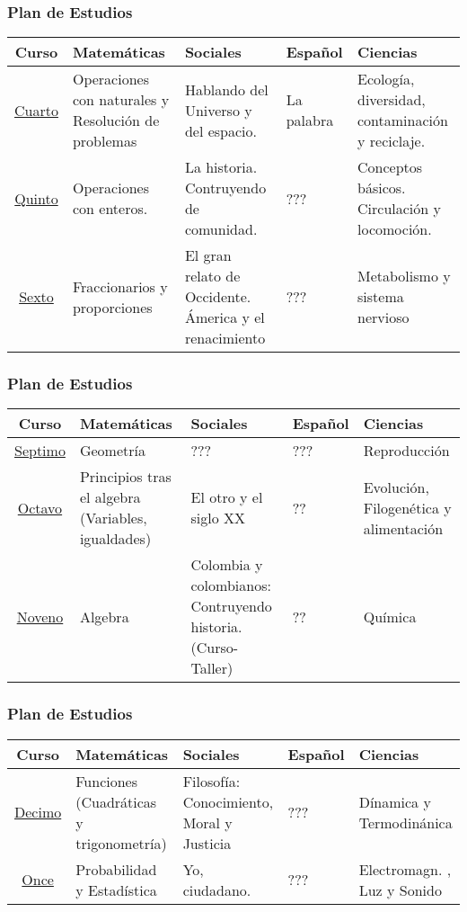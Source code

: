 \documentclass{beamer}
\begin{document}
\begin{frame}
\fontsize{9pt}{10}\selectfont
\frametitle{Plan de Estudios}
\begin{table}
\centering
\begin{tabular}{|c|p{2cm}|p{2cm}|p{2cm}|p{2cm}|}
\hline 
\textbf{Curso} & \textbf{Matem\'aticas} &\textbf{Sociales} &\textbf{Espa\~nol} & \textbf{Ciencias}\\
\hline
\underline{Cuarto} & Operaciones con naturales y Resoluci\'on de problemas   & Hablando del Universo y del espacio.  & La palabra & Ecolog\'ia, diversidad, contaminaci\'on y reciclaje.  \\
\underline{Quinto} & Operaciones con enteros.  & La historia. Contruyendo de comunidad. & ??? &Conceptos b\'asicos. Circulaci\'on y locomoci\'on.  \\
\underline{Sexto} & Fraccionarios y proporciones & El gran relato de Occidente. \'America y el renacimiento  & ??? & Metabolismo y sistema nervioso \\
\hline
\end{tabular}
\end{table}
\end{frame}


\begin{frame}
\fontsize{9pt}{10}\selectfont
\frametitle{Plan de Estudios}
\begin{table}
\centering
\begin{tabular}{|c|p{2cm}|p{2cm}|p{2cm}|p{2cm}|}
\hline 
\textbf{Curso} & \textbf{Matem\'aticas} &\textbf{Sociales} &\textbf{Espa\~nol} & \textbf{Ciencias}\\
\hline
\underline{Septimo} & Geometr\'ia & ??? & ???& Reproducci\'on \\
\underline{Octavo} & Principios tras el algebra (Variables, igualdades)  &El otro y el siglo XX & ??& Evoluci\'on, Filogen\'etica y  alimentaci\'on \\
\underline{Noveno} & Algebra & Colombia y colombianos: Contruyendo historia. (Curso-Taller)  & ??& Qu\'imica \\
\hline 
\end{tabular}
\end{table}
\end{frame}
\begin{frame}
\fontsize{9pt}{10}\selectfont
\frametitle{Plan de Estudios}
\begin{table}
\centering
\begin{tabular}{|c|p{2cm}|p{2cm}|p{2cm}|p{2cm}|}
\hline 
\textbf{Curso} & \textbf{Matem\'aticas} &\textbf{Sociales} &\textbf{Espa\~nol} & \textbf{Ciencias}\\
\hline
\underline{Decimo} & Funciones (Cuadr\'aticas y trigonometr\'ia)  & Filosof\'ia: Conocimiento, Moral y Justicia & ???& D\'inamica y Termodin\'anica\\
\underline{Once} & Probabilidad y Estad\'istica & Yo, ciudadano. & ??? & Electromagn. , Luz y Sonido \\
\hline 
\end{tabular}
\end{table}
\end{frame}
\end{document}
